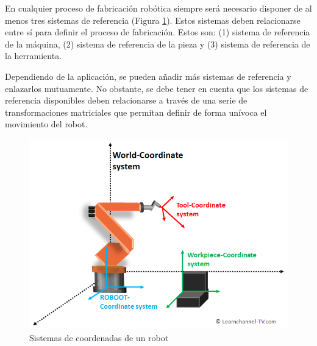 En cualquier proceso de fabricación robótica siempre será necesario disponer de al menos tres sistemas de referencia (Figura \ref{fig:Robotics-coordinate-systems}). Estos sistemas deben relacionarse entre sí para definir el proceso de fabricación. Estos son: (1) sistema de referencia de la máquina, (2) sistema de referencia de la pieza y (3) sistema de referencia de la herramienta.

Dependiendo de la aplicación, se pueden añadir más sistemas de referencia y enlazarlos mutuamente. No obstante, se debe tener en cuenta que los sistemas de referencia disponibles deben relacionarse a través de una serie de transformaciones matriciales que permitan definir de forma unívoca el movimiento del robot.
    
\begin{figure}[h!]
    \centering
    \includegraphics[scale=0.4]{figuras/Robotics-coordinate-systems.png}
    \caption{Sistemas de coordenadas de un robot \cite{Robot_Coordinate_Systems}}
    \label{fig:Robotics-coordinate-systems}
\end{figure}

